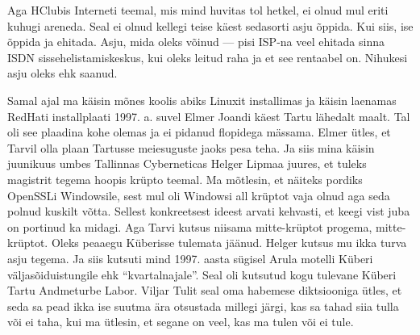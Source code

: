 Aga HClubis Interneti teemal, mis mind huvitas tol hetkel, ei olnud mul eriti kuhugi areneda. Seal ei olnud kellegi teise käest sedasorti asju õppida. Kui siis, ise õppida ja ehitada. Asju, mida oleks võinud --- pisi ISP-na veel ehitada sinna ISDN sissehelistamiskeskus, kui oleks leitud raha ja et see rentaabel on. Nihukesi asju oleks ehk saanud. 

Samal ajal ma käisin mõnes koolis abiks Linuxit installimas ja käisin laenamas RedHati installplaati 1997. a. suvel Elmer Joandi käest Tartu lähedalt maalt. Tal oli see plaadina kohe olemas ja ei pidanud flopidega mässama. Elmer ütles, et Tarvil olla plaan Tartusse meiesuguste jaoks pesa teha. Ja siis mina käisin juunikuus umbes Tallinnas Cyberneticas Helger Lipmaa  juures, et tuleks magistrit tegema hoopis krüpto teemal. Ma mõtlesin, et näiteks pordiks OpenSSLi Windowsile, sest mul oli Windowsi all krüptot vaja olnud aga seda polnud kuskilt võtta. Sellest konkreetsest ideest arvati kehvasti, et keegi vist juba on portinud ka midagi. Aga Tarvi kutsus niisama mitte-krüptot progema, mitte-krüptot. Oleks peaaegu Küberisse tulemata jäänud. Helger kutsus mu ikka turva asju tegema. Ja siis kutsuti mind 1997. aasta sügisel Arula motelli Küberi väljasõiduistungile ehk \enquote{kvartalnajale}. Seal oli kutsutud kogu tulevane Küberi Tartu Andmeturbe Labor. Viljar Tulit seal oma habemese diktsiooniga ütles, et seda sa pead ikka ise suutma ära otsustada millegi järgi, kas sa tahad siia tulla või ei taha, kui ma ütlesin, et segane on veel, kas ma tulen või ei tule. 

